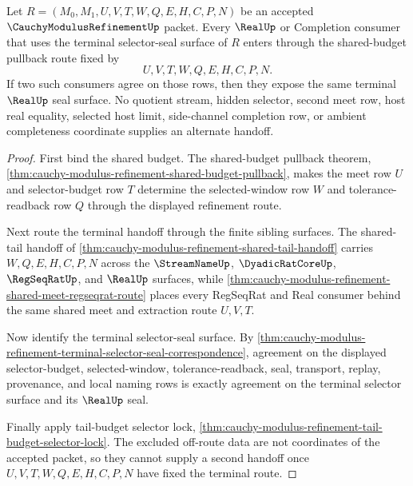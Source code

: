\begin{theorem}
\label{thm:cauchy-modulus-refinement-shared-budget-pullback-handoff}
Let $R=(M_0,M_1,U,V,T,W,Q,E,H,C,P,N)$ be an accepted $\CauchyModulusRefinementUp$ packet. Every $\RealUp$ or Completion consumer that uses the terminal selector-seal surface of $R$ enters through the shared-budget pullback route fixed by
$$
U,V,T,W,Q,E,H,C,P,N.
$$
If two such consumers agree on those rows, then they expose the same terminal $\RealUp$ seal surface. No quotient stream, hidden selector, second meet row, host real equality, selected host limit, side-channel completion row, or ambient completeness coordinate supplies an alternate handoff.
\end{theorem}
\begin{proof}
First bind the shared budget. The shared-budget pullback theorem, \autoref{thm:cauchy-modulus-refinement-shared-budget-pullback}, makes the meet row $U$ and selector-budget row $T$ determine the selected-window row $W$ and tolerance-readback row $Q$ through the displayed refinement route.

Next route the terminal handoff through the finite sibling surfaces. The shared-tail handoff of \autoref{thm:cauchy-modulus-refinement-shared-tail-handoff} carries $W,Q,E,H,C,P,N$ across the $\StreamNameUp$, $\DyadicRatCoreUp$, $\RegSeqRatUp$, and $\RealUp$ surfaces, while \autoref{thm:cauchy-modulus-refinement-shared-meet-regseqrat-route} places every RegSeqRat and Real consumer behind the same shared meet and extraction route $U,V,T$.

Now identify the terminal selector-seal surface. By \autoref{thm:cauchy-modulus-refinement-terminal-selector-seal-correspondence}, agreement on the displayed selector-budget, selected-window, tolerance-readback, seal, transport, replay, provenance, and local naming rows is exactly agreement on the terminal selector surface and its $\RealUp$ seal.

Finally apply tail-budget selector lock, \autoref{thm:cauchy-modulus-refinement-tail-budget-selector-lock}. The excluded off-route data are not coordinates of the accepted packet, so they cannot supply a second handoff once $U,V,T,W,Q,E,H,C,P,N$ have fixed the terminal route.
\end{proof}

